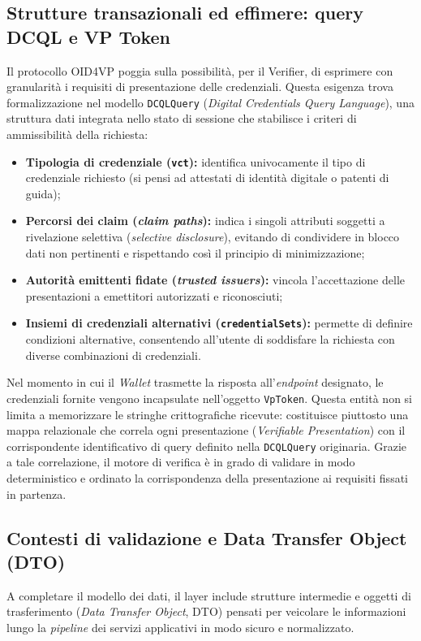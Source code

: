 \subsection{Strutture transazionali ed effimere: query DCQL e VP Token}
Il protocollo OID4VP poggia sulla possibilità, per il Verifier, di esprimere con granularità i requisiti di presentazione delle credenziali. Questa esigenza trova formalizzazione nel modello \texttt{DCQLQuery} (\textit{Digital Credentials Query Language}), una struttura dati integrata nello stato di sessione che stabilisce i criteri di ammissibilità della richiesta:
\begin{itemize}
    \item \textbf{Tipologia di credenziale (\texttt{vct}):} identifica univocamente il tipo di credenziale richiesto (si pensi ad attestati di identità digitale o patenti di guida);
    \item \textbf{Percorsi dei claim (\textit{claim paths}):} indica i singoli attributi soggetti a rivelazione selettiva (\textit{selective disclosure}), evitando di condividere in blocco dati non pertinenti e rispettando così il principio di minimizzazione;
    \item \textbf{Autorità emittenti fidate (\textit{trusted issuers}):} vincola l'accettazione delle presentazioni a emettitori autorizzati e riconosciuti;
    \item \textbf{Insiemi di credenziali alternativi (\texttt{credentialSets}):} permette di definire condizioni alternative, consentendo all'utente di soddisfare la richiesta con diverse combinazioni di credenziali.
\end{itemize}

Nel momento in cui il \textit{Wallet} trasmette la risposta all'\textit{endpoint} designato, le credenziali fornite vengono incapsulate nell'oggetto \texttt{VpToken}. Questa entità non si limita a memorizzare le stringhe crittografiche ricevute: costituisce piuttosto una mappa relazionale che correla ogni presentazione (\textit{Verifiable Presentation}) con il corrispondente identificativo di query definito nella \texttt{DCQLQuery} originaria. Grazie a tale correlazione, il motore di verifica è in grado di validare in modo deterministico e ordinato la corrispondenza della presentazione ai requisiti fissati in partenza.

\subsection{Contesti di validazione e Data Transfer Object (DTO)}
A completare il modello dei dati, il layer include strutture intermedie e oggetti di trasferimento (\textit{Data Transfer Object}, DTO\glsfirstoccur{}) pensati per veicolare le informazioni lungo la \textit{pipeline} dei servizi applicativi in modo sicuro e normalizzato.

